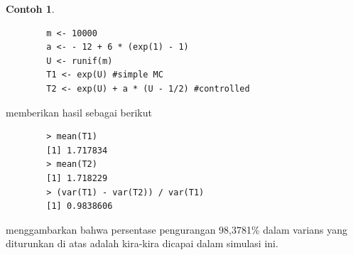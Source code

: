 \documentclass[a4paper,12pt]{article}
\theoremstyle{definition}
\newtheorem{example}{Contoh}[section]
\begin{document}
\begin{example}
    \begin{lstlisting}
        m <- 10000
        a <- - 12 + 6 * (exp(1) - 1)
        U <- runif(m)
        T1 <- exp(U) #simple MC
        T2 <- exp(U) + a * (U - 1/2) #controlled
    \end{lstlisting}   
    memberikan hasil sebagai berikut\\
    \begin{lstlisting}
        > mean(T1)
        [1] 1.717834
        > mean(T2)
        [1] 1.718229
        > (var(T1) - var(T2)) / var(T1)
        [1] 0.9838606
    \end{lstlisting}
\end{example}

menggambarkan bahwa persentase pengurangan 98,3781\% dalam varians yang diturunkan di atas adalah
kira-kira dicapai dalam simulasi ini.
\end{document}
